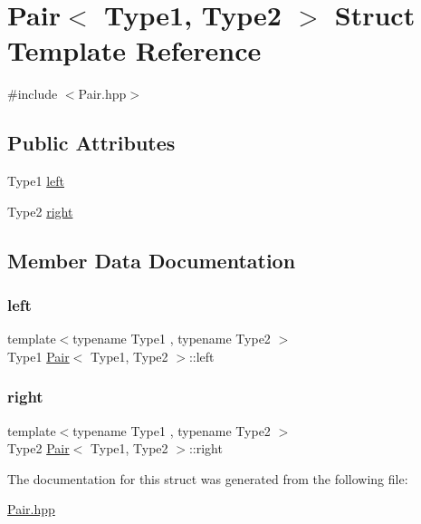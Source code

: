 \hypertarget{structPair}{}\section{Pair$<$ Type1, Type2 $>$ Struct Template Reference}
\label{structPair}


{\ttfamily \#include $<$Pair.\+hpp$>$}

\subsection*{Public Attributes}
\begin{DoxyCompactItemize}
\item 
Type1 \hyperlink{structPair_ab86bfd58f33f33e03e21d7155efac004}{left}
\item 
Type2 \hyperlink{structPair_aaf0031924cde3a4eeefeecea7c7caaf0}{right}
\end{DoxyCompactItemize}


\subsection{Member Data Documentation}
\mbox{\label{structPair_ab86bfd58f33f33e03e21d7155efac004}} 
\subsubsection{\texorpdfstring{left}{left}}
{\footnotesize\ttfamily template$<$typename Type1 , typename Type2 $>$ \\
Type1 \hyperlink{structPair}{Pair}$<$ Type1, Type2 $>$\+::left}

\mbox{\label{structPair_aaf0031924cde3a4eeefeecea7c7caaf0}} 
\subsubsection{\texorpdfstring{right}{right}}
{\footnotesize\ttfamily template$<$typename Type1 , typename Type2 $>$ \\
Type2 \hyperlink{structPair}{Pair}$<$ Type1, Type2 $>$\+::right}



The documentation for this struct was generated from the following file\+:\begin{DoxyCompactItemize}
\item 
\hyperlink{Pair_8hpp}{Pair.\+hpp}\end{DoxyCompactItemize}
